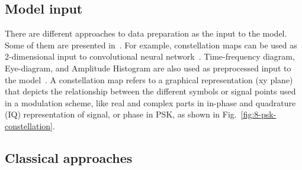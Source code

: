 
\subsection{Model input}

There are different approaches to data preparation as the input to the model. Some of them are presented in~\cite{amr_deep_networks_overview}. For example, constellation maps can be used as 2-dimensional input to convolutional neural network~\cite{amr_survey_deep_learning,vgg_simc,learning_constellation_map}. Time-frequency diagram, Eye-diagram, and Amplitude Histogram are also used as preprocessed input to the model~\cite{amr_deep_networks_overview}. A constellation map refers to a graphical representation (xy plane) that depicts the relationship between the different symbols or signal points used in a modulation scheme, like real and complex parts in in-phase and quadrature (IQ) representation of signal, or phase in PSK, as shown in Fig.~\ref{fig:8-psk-constellation}. 






\subsection{Classical approaches}

